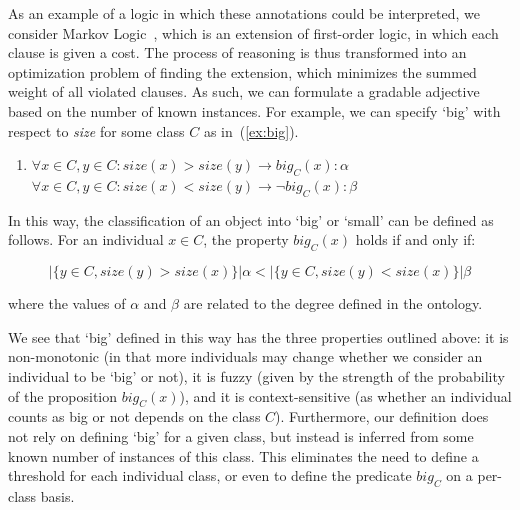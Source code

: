 \documentclass[11pt]{article}
\begin{document}
As an example of a logic in which these 
annotations could be interpreted, we consider Markov Logic~\cite{richardson2006markov}, which is an 
extension of first-order logic, in which each clause is given a cost. The process 
of reasoning is thus transformed into an optimization problem of finding the 
extension, which minimizes the summed weight of all violated clauses. As such, we
can formulate a gradable adjective based on the number of known instances. 
For example, we can specify `big' with respect to \emph{size} for some class $C$ as in~(\ref{ex:big}).
%
\begin{enumerate}
\item $\forall x \in C, y \in C : size(x) > size(y) \rightarrow big_C(x) : \alpha$ \\
$\forall x \in C, y \in C : size(x) < size(y) \rightarrow \neg big_C(x) : \beta$
\label{ex:big}
\end{enumerate}
%
In this way, the classification of an object into `big' or `small' can be defined as follows.
For an individual $x \in C$, the property $big_C(x)$ holds if and only if: 

\vspace{-1.0em}
$$|\{y \in C, size(y) > size(x)\}| \alpha < |\{y \in C, size(y) < size(x)\}| \beta$$
\vspace{-1.5em}

where the values of $\alpha$ and $\beta$ are related to the degree defined
in the ontology.

We see that `big' defined in this way has the three properties outlined above: 
it is non-monotonic (in that more individuals may change whether we consider an individual 
to be `big' or not), it is fuzzy (given by the strength of the probability of the proposition $big_C(x)$), 
and it is context-sensitive (as whether an individual counts as big or not depends on the class $C$). 
Furthermore, our definition does not rely on defining `big' for a given class, but instead is inferred
from some known number of instances of this class. This eliminates the need to
define a threshold for each individual class, or even to define the predicate $big_C$ on a per-class
basis.
\end{document}
